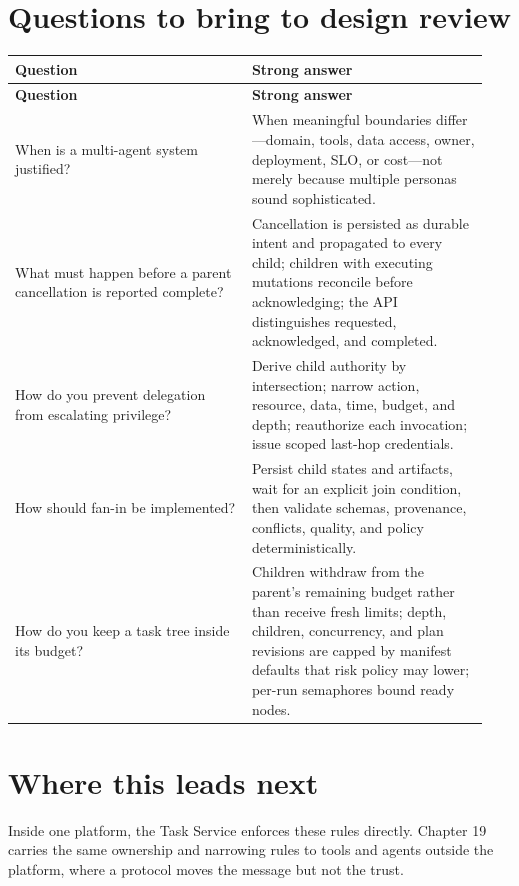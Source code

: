 \section{Questions to bring to design review}

\BookTableStart
\small
\begin{longtable}{@{}Y{0.4700\linewidth}Y{0.4700\linewidth}@{}}
\color{white}\bfseries \textbf{Question} & \color{white}\bfseries \textbf{Strong answer} \\
\endfirsthead
{}
\color{white}\bfseries \textbf{Question} & \color{white}\bfseries \textbf{Strong answer} \\
\endhead
When is a multi-agent system justified? & When meaningful boundaries differ—domain, tools, data access, owner, deployment, SLO, or cost—not merely because multiple personas sound sophisticated. \\
What must happen before a parent cancellation is reported complete? & Cancellation is persisted as durable intent and propagated to every child; children with executing mutations reconcile before acknowledging; the API distinguishes requested, acknowledged, and completed. \\
How do you prevent delegation from escalating privilege? & Derive child authority by intersection; narrow action, resource, data, time, budget, and depth; reauthorize each invocation; issue scoped last-hop credentials. \\
How should fan-in be implemented? & Persist child states and artifacts, wait for an explicit join condition, then validate schemas, provenance, conflicts, quality, and policy deterministically. \\
How do you keep a task tree inside its budget? & Children withdraw from the parent's remaining budget rather than receive fresh limits; depth, children, concurrency, and plan revisions are capped by manifest defaults that risk policy may lower; per-run semaphores bound ready nodes. \\
\end{longtable}
\BookTableEnd

\section{Where this leads next}

Inside one platform, the Task Service enforces these rules directly. Chapter 19 carries the same ownership and narrowing rules to tools and agents outside the platform, where a protocol moves the message but not the trust.\par

